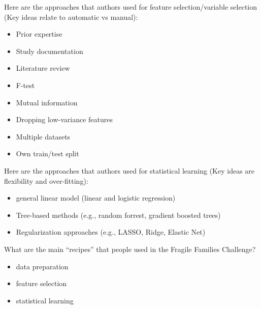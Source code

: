 \documentclass{beamer}
\begin{document}
\begin{frame}

Here are the approaches that authors used for feature selection/variable selection (Key ideas relate to automatic vs manual):

\begin{itemize}
\item Prior expertise
\item Study documentation
\item Literature review
\item F-test
\item Mutual information
\item Dropping low-variance features
\item Multiple datasets
\item Own train/test split
\end{itemize}

\end{frame}
\begin{frame}
Here are the approaches that authors used for statistical learning (Key ideas are flexibility and over-fitting):

\begin{itemize}
\item general linear model (linear and logistic regression)
\item Tree-based methods (e.g., random forrest, gradient boosted trees)
\item Regularization approaches (e.g., LASSO, Ridge, Elastic Net)
\end{itemize}

\end{frame}
\begin{frame}

What are the main ``recipes'' that people used in the Fragile Families Challenge?
\begin{itemize}
\item data preparation
\item feature selection
\item statistical learning
\end{itemize}

\end{frame}
\end{document}
